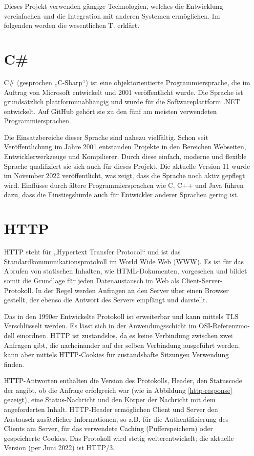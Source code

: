 Dieses Projekt verwenden gängige Technologien, welches die Entwicklung vereinfachen und die Integration mit anderen Systemen ermöglichen. Im folgenden werden die wesentlichen T. erklärt.

\section{C\#}
C\# (gesprochen „C-Sharp“) ist eine objektorientierte Programmiersprache, die im Auftrag von Microsoft entwickelt und 2001 veröffentlicht wurde.
Die Sprache ist grundsätzlich plattformunabhängig und wurde für die Softwareplattform .NET entwickelt.
Auf GitHub gehört sie zu den fünf am meisten verwendeten Programmiersprachen.\cite{ms-csharp}

Die Einsatzbereiche dieser Sprache sind nahezu vielfältig.
Schon seit Veröffentlichung im Jahre 2001 entstanden Projekte in den Bereichen Webseiten, Entwicklerwerkzeuge und Kompilierer.
Durch diese einfach, moderne und flexible Sprache qualifiziert sie sich auch für dieses Projekt.
Die aktuelle Version 11 wurde im November 2022 veröffentlicht, was zeigt, dass die Sprache noch aktiv gepflegt wird.
Einflüsse durch ältere Programmiersprachen wie C, C++ und Java führen dazu, dass die Einstiegshürde auch für Entwickler anderer Sprachen gering ist. \cite{dev-csharp}

\section{HTTP}
HTTP steht für „Hypertext Transfer Protocol“ und ist das Standardkommunikationsprotokoll im World Wide Web (WWW).
Es ist für das Abrufen von statischen Inhalten, wie HTML-Dokumenten, vorgesehen und bildet somit die Grundlage für jeden Datenaustausch im Web als Client-Server-Protokoll.
In der Regel werden Anfragen an den Server über einen Browser gestellt, der ebenso die Antwort des Servers empfängt und darstellt.

Das  in den 1990er Entwickelte Protokoll ist erweiterbar und kann mittels TLS Verschlüsselt werden. Es lässt sich in der Anwendungsschicht im OSI-Referenzmo-dell einordnen.
HTTP ist zustandslos, da es keine Verbindung zwischen zwei Anfragen gibt, die nacheinander auf der selben Verbindung ausgeführt werden, kann aber mittels HTTP-Cookies für zustandshafte Sitzungen Verwendung finden.\cite{mdn-http}

HTTP-Antworten enthalten die Version des Protokolls, Header, den Statuscode der angibt, ob die Anfrage erfolgreich war (wie in Abbildung \vref{http-response} gezeigt), eine Status-Nachricht und den Körper der Nachricht mit dem angeforderten Inhalt.
HTTP-Header ermöglichen Client und Server den Austausch zusätzlicher Informationen, so z.B. für die Authentifizierung des Clients am Server, für das verwendete Caching (Pufferspeichern) oder gespeicherte Cookies.\cite{mdn-http-header}
Das Protokoll wird stetig weiterentwickelt; die aktuelle Version (per Juni 2022) ist HTTP/3.

